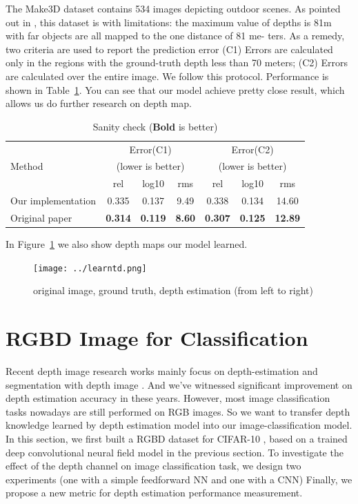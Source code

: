 \documentclass[journal]{IEEEtran}
\begin{document}
The Make3D dataset contains 534 images depicting outdoor scenes. As pointed out 
in \cite{liu2014discrete}, this dataset is with limitations: the maximum value 
of depths is 81m with far objects are all mapped to the one distance of 81 
me- ters. As a remedy, two criteria are used to report the prediction error (C1) 
Errors are calculated only in the regions with the ground-truth depth less 
than 70 meters; (C2) Errors are calculated over the entire image. We follow this 
protocol.
Performance is shown in Table~\ref{tab:sanity}. 
You can see that
our model achieve pretty close result, which allows us do further research on depth map.
\begin{table} \center
	\resizebox{\linewidth}{!} {
		\begin{tabular}{ | l |  c  c  c | c  c  c |}
			\hline 
			\multirow{3}{*}{{{Method}}} &\multicolumn{3}{c|}{Error(C1)} 
			&\multicolumn{3}{c|}{Error(C2)} \\
			&\multicolumn{3}{c|}{(lower is better)} &\multicolumn{3}{c|}{(lower is better)} 
			\\
			\cline{2-7}
			&rel &log10 &rms &rel &log10 &rms  \\
			\hline
			Our implementation &0.335&0.137&9.49&0.338&0.134&14.60 \\
			Original paper    &\textbf{0.314}&\textbf{0.119}  &\textbf{8.60}  
			&\textbf{0.307} 	 &\textbf{0.125}	 &\textbf{12.89} \\
			\hline
		\end{tabular}
	}
	\caption{Sanity check (\textbf{Bold} is better)}
	\label{tab:sanity}
\end{table}

In Figure~\ref{fig:depthest} we also show depth maps our model learned.
\begin{figure}
	\texttt{[image: ../learntd.png]}
	\caption{original image, ground truth, depth estimation (from left to right)}
	\label{fig:depthest}
\end{figure}

\section{RGBD Image for Classification}
Recent depth image research works mainly focus on depth-estimation \cite{liu2015deep} 
and segmentation with depth image \cite{eigen2015predicting}.
And we\rq{}ve witnessed significant improvement on depth estimation accuracy in these years. 
However, most image classification tasks nowadays are still performed on RGB images.
So we want to transfer depth knowledge learned by depth estimation model into our image-classification model.
In this section, 
we first built a RGBD dataset for CIFAR-10 \cite{krizhevsky2009learning}, 
based on a trained deep convolutional neural field model in the previous section. 
To investigate the effect of the depth channel on image classification task, 
we design two experiments (one with a simple feedforward NN and one with a CNN) 
Finally, we propose a new metric for depth estimation performance measurement.
\end{document}
